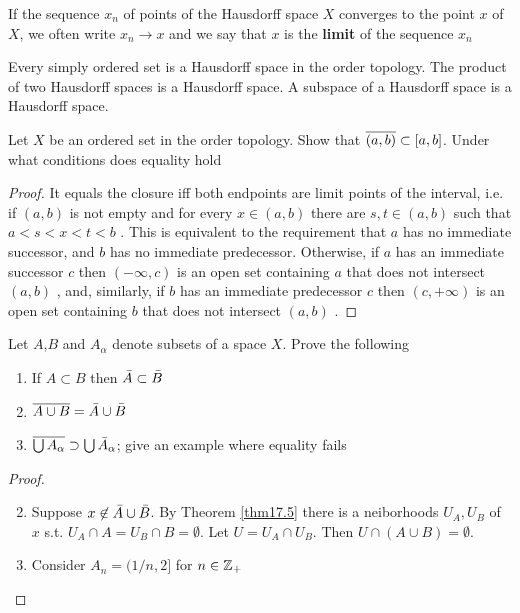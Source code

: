 \documentclass[11pt]{article}
\begin{document}
If the sequence \(x_n\) of points of the Hausdorff space \(X\) converges to the point \(x\)
of \(X\), we often write \(x_n\to x\) and we say that \(x\) is the \textbf{limit} of the sequence \(x_n\)

\begin{theorem}[]
Every simply ordered set is a Hausdorff space in the order topology. The product of two Hausdorff
spaces is a Hausdorff space. A subspace of a Hausdorff space is a Hausdorff space.
\end{theorem}

\begin{exercise}
\label{ex17.5}
Let \(X\) be an ordered set in the order topology. Show that \(\overline{(a,b)}\subset[a,b]\). Under what
conditions does equality hold
\end{exercise}

\begin{proof}
It equals the closure iff both endpoints are limit points of the interval, i.e. if \((a,b)\) is not
empty and for every \(x\in(a,b)\) there are \(s,t\in(a,b)\) such that \(a<s<x<t<b\) . This is equivalent to the
requirement that \(a\) has no immediate successor, and \(b\) has no immediate predecessor. Otherwise, if
\(a\) has an immediate successor \(c\) then \((−∞,c)\) is an open set containing \(a\) that does not intersect
\((a,b)\) , and, similarly, if \(b\) has an immediate predecessor \(c\) then \((c,+∞)\) is an open set containing
\(b\) that does not intersect \((a,b)\) .
\end{proof}

\begin{exercise}
\label{ex17.6}
Let \(A\),\(B\) and \(A_\alpha\) denote subsets of a space \(X\). Prove the following
\begin{enumerate}
\item If \(A\subset B\) then \(\bar{A}\subset\bar{B}\)
\item \(\overline{A\cup B}=\bar{A}\cup\bar{B}\)
\item \(\overline{\bigcup A_\alpha}\supset\bigcup\bar{A}_\alpha\); give an example where equality fails
\end{enumerate}
\end{exercise}

\begin{proof}
\begin{enumerate}
\setcounter{enumi}{1}
\item Suppose \(x\not\in\bar{A}\cup\bar{B}\). By Theorem \ref{thm17.5} there is a neiborhoods \(U_A,U_B\)
of \(x\) s.t. \(U_A\cap A=U_B\cap B=\emptyset\).  Let \(U=U_A\cap U_B\). Then \(U\cap(A\cup B)=\emptyset\).
\item Consider \(A_n=(1/n,2]\) for \(n\in\mathbb{Z}_+\)
\end{enumerate}
\end{proof}
\end{document}
